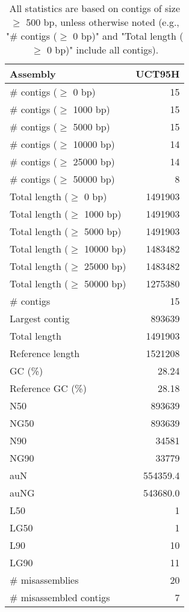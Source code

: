 \documentclass[12pt,a4paper]{article}
\begin{document}
\begin{table}[ht]
\begin{center}
\caption{All statistics are based on contigs of size $\geq$ 500 bp, unless otherwise noted (e.g., "\# contigs ($\geq$ 0 bp)" and "Total length ($\geq$ 0 bp)" include all contigs).}
\begin{tabular}{|l*{1}{|r}|}
\hline
Assembly & UCT95H \\ \hline
\# contigs ($\geq$ 0 bp) & 15 \\ \hline
\# contigs ($\geq$ 1000 bp) & 15 \\ \hline
\# contigs ($\geq$ 5000 bp) & 15 \\ \hline
\# contigs ($\geq$ 10000 bp) & 14 \\ \hline
\# contigs ($\geq$ 25000 bp) & 14 \\ \hline
\# contigs ($\geq$ 50000 bp) & 8 \\ \hline
Total length ($\geq$ 0 bp) & 1491903 \\ \hline
Total length ($\geq$ 1000 bp) & 1491903 \\ \hline
Total length ($\geq$ 5000 bp) & 1491903 \\ \hline
Total length ($\geq$ 10000 bp) & 1483482 \\ \hline
Total length ($\geq$ 25000 bp) & 1483482 \\ \hline
Total length ($\geq$ 50000 bp) & 1275380 \\ \hline
\# contigs & 15 \\ \hline
Largest contig & 893639 \\ \hline
Total length & 1491903 \\ \hline
Reference length & 1521208 \\ \hline
GC (\%) & 28.24 \\ \hline
Reference GC (\%) & 28.18 \\ \hline
N50 & 893639 \\ \hline
NG50 & 893639 \\ \hline
N90 & 34581 \\ \hline
NG90 & 33779 \\ \hline
auN & 554359.4 \\ \hline
auNG & 543680.0 \\ \hline
L50 & 1 \\ \hline
LG50 & 1 \\ \hline
L90 & 10 \\ \hline
LG90 & 11 \\ \hline
\# misassemblies & 20 \\ \hline
\# misassembled contigs & 7 \\ \hline

\end{tabular}
\end{center}
\end{table}
\end{document}
